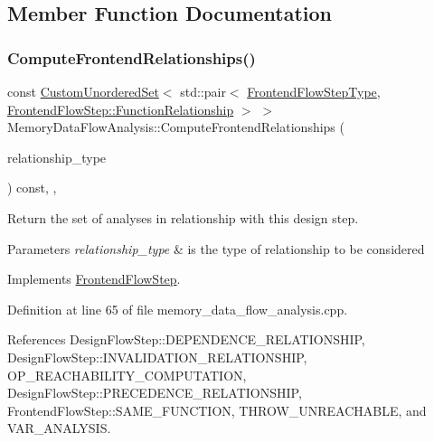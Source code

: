 \subsection{Member Function Documentation}
\mbox{\label{classMemoryDataFlowAnalysis_a421b53a83bfda726cfadd87f0232bb0d}} 
\subsubsection{\texorpdfstring{Compute\+Frontend\+Relationships()}{ComputeFrontendRelationships()}}
{\footnotesize\ttfamily const \hyperlink{classCustomUnorderedSet}{Custom\+Unordered\+Set}$<$ std\+::pair$<$ \hyperlink{frontend__flow__step_8hpp_afeb3716c693d2b2e4ed3e6d04c3b63bb}{Frontend\+Flow\+Step\+Type}, \hyperlink{classFrontendFlowStep_af7cf30f2023e5b99e637dc2058289ab0}{Frontend\+Flow\+Step\+::\+Function\+Relationship} $>$ $>$ Memory\+Data\+Flow\+Analysis\+::\+Compute\+Frontend\+Relationships (\begin{DoxyParamCaption}\item[{const \hyperlink{classDesignFlowStep_a723a3baf19ff2ceb77bc13e099d0b1b7}{Design\+Flow\+Step\+::\+Relationship\+Type}}]{relationship\+\_\+type }\end{DoxyParamCaption}) const\hspace{0.3cm}{\ttfamily [override]}, {\ttfamily [private]}, {\ttfamily [virtual]}}



Return the set of analyses in relationship with this design step. 


\begin{DoxyParams}{Parameters}
{\em relationship\+\_\+type} & is the type of relationship to be considered \\
\hline
\end{DoxyParams}


Implements \hyperlink{classFrontendFlowStep_abeaff70b59734e462d347ed343dd700d}{Frontend\+Flow\+Step}.



Definition at line 65 of file memory\+\_\+data\+\_\+flow\+\_\+analysis.\+cpp.



References Design\+Flow\+Step\+::\+D\+E\+P\+E\+N\+D\+E\+N\+C\+E\+\_\+\+R\+E\+L\+A\+T\+I\+O\+N\+S\+H\+IP, Design\+Flow\+Step\+::\+I\+N\+V\+A\+L\+I\+D\+A\+T\+I\+O\+N\+\_\+\+R\+E\+L\+A\+T\+I\+O\+N\+S\+H\+IP, O\+P\+\_\+\+R\+E\+A\+C\+H\+A\+B\+I\+L\+I\+T\+Y\+\_\+\+C\+O\+M\+P\+U\+T\+A\+T\+I\+ON, Design\+Flow\+Step\+::\+P\+R\+E\+C\+E\+D\+E\+N\+C\+E\+\_\+\+R\+E\+L\+A\+T\+I\+O\+N\+S\+H\+IP, Frontend\+Flow\+Step\+::\+S\+A\+M\+E\+\_\+\+F\+U\+N\+C\+T\+I\+ON, T\+H\+R\+O\+W\+\_\+\+U\+N\+R\+E\+A\+C\+H\+A\+B\+LE, and V\+A\+R\+\_\+\+A\+N\+A\+L\+Y\+S\+IS.

